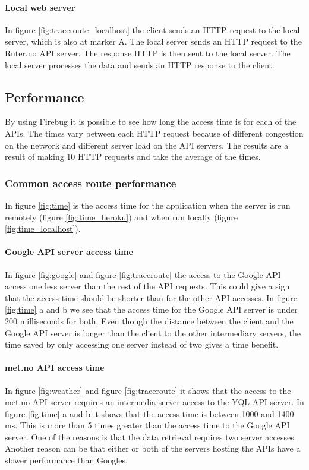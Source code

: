 \documentclass[10pt,a4paper]{article}
\begin{document}
\paragraph{Local web server}
In figure \ref{fig:traceroute_localhost} the client sends an HTTP request to the local server, which is also at marker A. The local server sends an HTTP request to the Ruter.no API server. The response HTTP is then sent to the local server. The local server processes the data and sends an HTTP response to the client.




\subsection{Performance}
By using Firebug it is possible to see how long the access time is for each of the APIs. The times vary between each HTTP request because of different congestion on the network and different server load on the API servers. The results are a result of making 10 HTTP requests and take the average of the times. 

\subsubsection{Common access route performance}
In figure \ref{fig:time} is the access time for the application when the server is run remotely (figure \ref{fig:time_heroku}) and when run locally (figure \ref{fig:time_localhost}). 
\paragraph{Google API server access time}
In figure \ref{fig:google} and figure \ref{fig:traceroute} the access to the Google API access one less server than the rest of the API requests. This could give a sign that the access time should be shorter than for the other API accesses. In figure \ref{fig:time} a and b we see that the access time for the Google API server is under 200 milliseconds for both. Even though the distance between the client and the Google API server is longer than the client to the other intermediary servers, the time saved by only accessing one server instead of two gives a time benefit.
\paragraph{met.no API access time}
In figure \ref{fig:weather} and figure \ref{fig:traceroute} it shows that the access to the met.no API server requires an intermedia server access to the YQL API server. In figure \ref{fig:time} a and b it shows that the access time is between 1000 and 1400 ms. This is more than 5 times greater than the access time to the Google API server. One of the reasons is that the data retrieval requires two server accesses. Another reason can be that either or both of the servers hosting the APIs have a slower performance than Googles.
\end{document}
